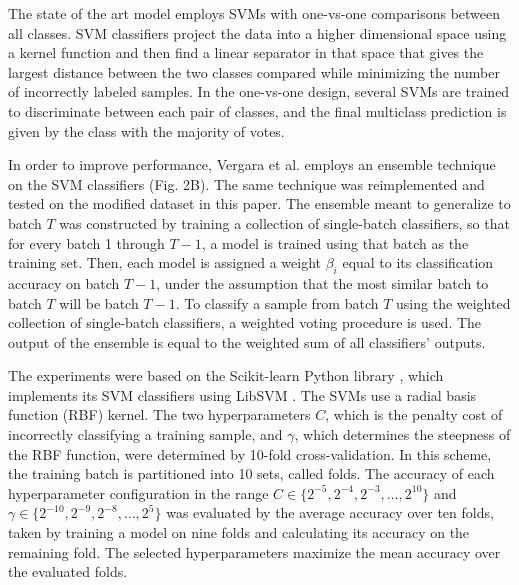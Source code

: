 \documentclass[onecolumn,pre,floats,aps,amsmath,amssymb,superscriptaddress]{revtex4-1}
\begin{document}
The state of the art model \cite{vergara_chemical_2012} employs SVMs with one-vs-one comparisons between all classes. SVM classifiers project the data into a higher dimensional space using a kernel function and then find a linear separator in that space that gives the largest distance between the two classes compared while minimizing the number of incorrectly labeled samples. In the one-vs-one design, several SVMs are trained to discriminate between each pair of classes, and the final multiclass prediction is given by the class with the majority of votes.

In order to improve performance, Vergara et al. \cite{vergara_chemical_2012} employs an ensemble technique on the SVM classifiers (Fig. 2B). The same technique was reimplemented and tested on the modified dataset in this paper. The ensemble meant to generalize to batch $T$ was constructed by training a collection of single-batch classifiers, so that for every batch 1 through $T-1$, a model is trained using that batch as the training set. Then, each model is assigned a weight $\beta_i$ equal to its classification accuracy on batch $T-1$, under the assumption that the most similar batch to batch $T$ will be batch $T-1$. To classify a sample from batch $T$ using the weighted collection of single-batch classifiers, a weighted voting procedure is used. The output of the ensemble is equal to the weighted sum of all classifiers' outputs.

The experiments were based on the Scikit-learn Python library \cite{pedregosa_scikit-learn_2011}, which implements its SVM classifiers using LibSVM \citep{chang_libsvm_2011}. The SVMs use a radial basis function (RBF) kernel. The two hyperparameters $C$, which is the penalty cost of incorrectly classifying a training sample, and $\gamma$, which determines the steepness of the RBF function, were determined by 10-fold cross-validation. In this scheme, the training batch is partitioned into 10  sets, called folds. The accuracy of each hyperparameter configuration in the range $C \in \{ 2^{-5}, 2^{-4}, 2^{-3}, \ldots, 2^{10} \}$ and $\gamma \in \{ 2^{-10}, 2^{-9}, 2^{-8}, \ldots, 2^{5} \}$ was evaluated by the average accuracy over ten folds, taken by training a model on nine folds and calculating its accuracy on the remaining fold. The selected hyperparameters maximize the mean accuracy over the evaluated folds.
\end{document}
